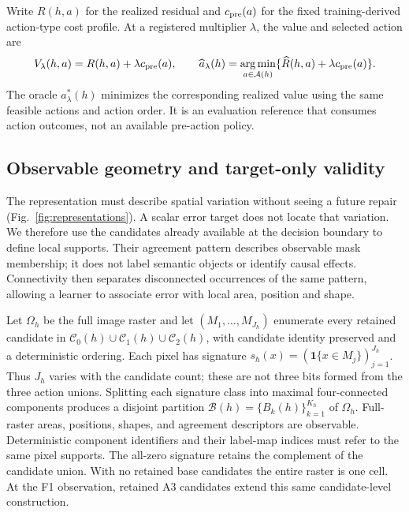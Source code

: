 Write $R(h,a)$ for the realized residual and $c_{\rm pre}(a)$ for the fixed
training-derived action-type cost profile. At a registered multiplier
$\lambda$, the value and selected action are
\begin{equation}
 V_\lambda(h,a)=R(h,a)+\lambda c_{\rm pre}(a),\qquad
 \widehat a_\lambda(h)=\mathop{\arg\min}_{a\in\mathcal A(h)}
       \{\widehat R(h,a)+\lambda c_{\rm pre}(a)\}.
 \label{eq:unified-value}
\end{equation}
The oracle $a^*_\lambda(h)$ minimizes the corresponding realized value using
the same feasible actions and action order. It is an evaluation reference
that consumes action outcomes, not an available pre-action policy.

\subsection{Observable geometry and target-only validity}
\label{sec:observable-geometry}
The representation must describe spatial variation without seeing a future
repair (Fig.~\ref{fig:representations}). A scalar error target does not locate that variation. We therefore
use the candidates already available at the decision boundary to define
local supports. Their agreement pattern describes observable mask membership;
it does not label semantic objects or identify causal effects. Connectivity
then separates disconnected occurrences of the same pattern, allowing a
learner to associate error with local area, position and shape.

Let $\Omega_h$ be the full image raster and let
$(M_1,\ldots,M_{J_h})$ enumerate every retained candidate in
$\mathcal C_0(h)\cup\mathcal C_1(h)\cup\mathcal C_2(h)$, with candidate
identity preserved and a deterministic ordering. Each pixel has signature
$s_h(x)=(\mathbf 1\{x\in M_j\})_{j=1}^{J_h}$. Thus $J_h$ varies with the
candidate count; these are not three bits formed from the three action
unions. Splitting each signature class into maximal four-connected
components produces a disjoint partition
$\mathcal B(h)=\{B_k(h)\}_{k=1}^{K_h}$ of $\Omega_h$. Full-raster areas,
positions, shapes, and agreement descriptors are observable. Deterministic
component identifiers and their label-map indices must refer to the same
pixel supports. The all-zero signature retains the complement of the
candidate union. With no retained base candidates the entire raster is one
cell. At the F1 observation, retained A3 candidates extend this same
candidate-level construction.

